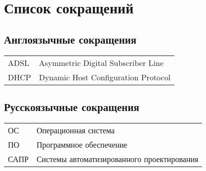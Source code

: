
\chapter*{Список сокращений}

\section*{Англоязычные сокращения}
\begin{longtable}{p{}p{}}
ADSL & Asymmetric Digital Subscriber Line\\
DHCP & Dynamic Host Configuration Protocol
\end{longtable} 


\section*{Русскоязычные сокращения}
\begin{longtable}{p{}p{}}
 ОС & Операционная система\\ 
 ПО & Программное обеспечение\\
 САПР & Системы автоматизированного проектирования
\end{longtable} 





